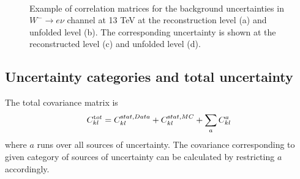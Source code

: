 \begin{figure}[h]
  \centering
   \\
  \caption{ Example of correlation matrices for the background uncertainties in $W^{-}\rightarrow e\nu$ channel at 13 TeV at the reconstruction level (a) and unfolded level (b). The corresponding uncertainty is shown at the reconstructed level (c) and unfolded level (d).}
  \label{fig:BkgSys}
\end{figure}


\subsection{Uncertainty categories and total uncertainty}
\label{subsec:uncsummary}
The total covariance matrix is
\begin{equation}
C_{kl}^{\textrm tot} = C_{kl}^{\textrm stat,Data} + C_{kl}^{\textrm stat,MC} + \sum_a C_{kl}^a
\end{equation}
where $a$ runs over all sources of uncertainty. The covariance corresponding to given category of sources of uncertainty can be calculated by restricting $a$ accordingly.



